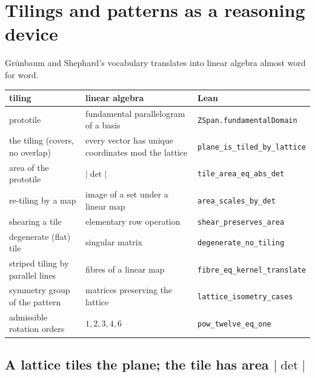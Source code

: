 \documentclass[11pt]{article}
\theoremstyle{definition}
\theoremstyle{plain}
\theoremstyle{remark}
\newcommand{\lean}[1]{\texttt{\small #1}}
\begin{document}
\section{Tilings and patterns as a reasoning device}

Grünbaum and Shephard's vocabulary translates into linear algebra almost word
for word.

\begin{center}\small
\begin{tabular}{@{}p{40mm}p{45mm}p{50mm}@{}}
\toprule
\textbf{tiling} & \textbf{linear algebra} & \textbf{Lean} \\
\midrule
prototile & fundamental parallelogram of a basis & \lean{ZSpan.fundamentalDomain} \\
the tiling (covers, no overlap) & every vector has unique coordinates mod the lattice & \lean{plane\_is\_tiled\_by\_lattice} \\
area of the prototile & $|\det|$ & \lean{tile\_area\_eq\_abs\_det} \\
re-tiling by a map & image of a set under a linear map & \lean{area\_scales\_by\_det} \\
shearing a tile & elementary row operation & \lean{shear\_preserves\_area} \\
degenerate (flat) tile & singular matrix & \lean{degenerate\_no\_tiling} \\
striped tiling by parallel lines & fibres of a linear map & \lean{fibre\_eq\_kernel\_translate} \\
symmetry group of the pattern & matrices preserving the lattice & \lean{lattice\_isometry\_cases} \\
admissible rotation orders & $1,2,3,4,6$ & \lean{pow\_twelve\_eq\_one} \\
\bottomrule
\end{tabular}
\end{center}

\subsection{A lattice tiles the plane; the tile has area $|\det|$}

\begin{center}
\end{center}
\end{document}
